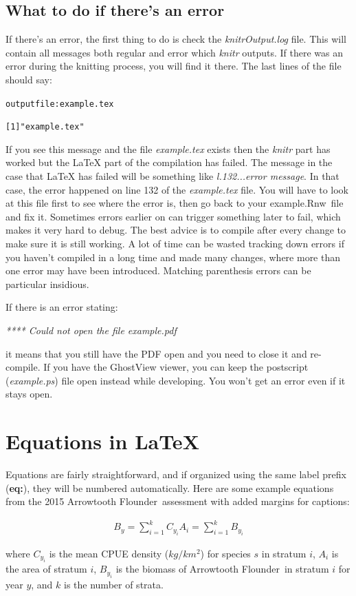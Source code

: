 \documentclass[11pt]{book}\usepackage[]{graphicx}\usepackage[]{color}
\newcommand{\texfile}{example.tex}
\newcommand{\rnwexamplefile}{example.Rnw}
\newcommand{\latex}{\LaTeX\xspace}
\newcommand{\fishnameARF}{Arrowtooth Flounder}
\begin{document}
\subsection{What to do if there's an error}

If there's an error, the first thing to do is check the \emph{knitrOutput.log} file. This will contain all messages both regular and error which \emph{knitr} outputs. If there was an error during the knitting process, you will find it there. The last lines of the file should say:
\begin{alltt}
  output file: \texfile

  [1] "\texfile"
\end{alltt}
If you see this message and the file \emph{\texfile} exists then the \emph{knitr} part has worked but the \latex part of the compilation has failed. The message in the case that \latex has failed will be something like \emph{l.132...error message}. In that case, the error happened on line 132 of the \emph{\texfile} file. You will have to look at this file first to see where the error is, then go back to your \rnwexamplefile\ file and fix it. Sometimes errors earlier on can trigger something later to fail, which makes it very hard to debug. The best advice is to compile after every change to make sure it is still working. A lot of time can be wasted tracking down errors if you haven't compiled in a long time and made many changes, where more than one error may have been introduced. Matching parenthesis errors can be particular insidious.

If there is an error stating:

\emph{**** Could not open the file example.pdf}

it means that you still have the PDF open and you need to close it and re-compile. If you have the GhostView viewer, you can keep the postscript (\emph{example.ps}) file open instead while developing. You won't get an error even if it stays open.

\bigskip

\section{Equations in \latex}
Equations are fairly straightforward, and if organized using the same label prefix (\textbf{eq:}), they will be numbered automatically. Here are some example equations from the 2015 \fishnameARF\ assessment with added margins for captions:

\begin{align} \label{eq:sweptareaindex}
B_y = \sum_{i=1}^kC_{y_i}A_i=\sum_{i=1}^kB_{y_i}
\end{align}
\begin{addmargin}[3em]{1em}
where $C_{y_i}$ is the mean CPUE density ($kg/km^2$) for species $s$ in stratum $i$, $A_i$ is the area of stratum $i$, $B_{y_i}$ is the biomass of \fishnameARF\ in stratum $i$ for year $y$, and $k$ is the number of strata.
\end{addmargin}
\end{document}
